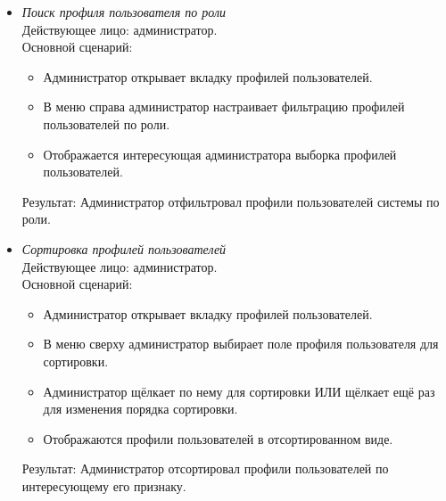 \begin{itemize}[topsep=0pt, parsep=0pt, itemsep=0pt, leftmargin=*, labelindent=0.5cm]
	\item \textit{Поиск профиля пользователя по роли} \\
	Действующее лицо: администратор. \\
	Основной сценарий:
	\begin{itemize}[topsep=0pt, parsep=0pt, itemsep=0pt, leftmargin=*, labelindent=0.5cm]
		\item Администратор открывает вкладку профилей пользователей.
		\item В меню справа администратор настраивает фильтрацию профилей пользователей по роли.
		\item Отображается интересующая администратора выборка профилей пользователей.
	\end{itemize}
	Результат: Администратор отфильтровал профили пользователей системы по роли.
\end{itemize}

\begin{itemize}[topsep=0pt, parsep=0pt, itemsep=0pt, leftmargin=*, labelindent=0.5cm]
	\item \textit{Сортировка профилей пользователей} \\
	Действующее лицо: администратор. \\
	Основной сценарий:
	\begin{itemize}[topsep=0pt, parsep=0pt, itemsep=0pt, leftmargin=*, labelindent=0.5cm]
		\item Администратор открывает вкладку профилей пользователей.
		\item В меню сверху администратор выбирает поле профиля пользователя для сортировки.
		\item Администратор щёлкает по нему для сортировки ИЛИ щёлкает ещё раз для изменения порядка сортировки.
		\item Отображаются профили пользователей в отсортированном виде.
	\end{itemize}
	Результат: Администратор отсортировал профили пользователей по интересующему его признаку.
\end{itemize}

